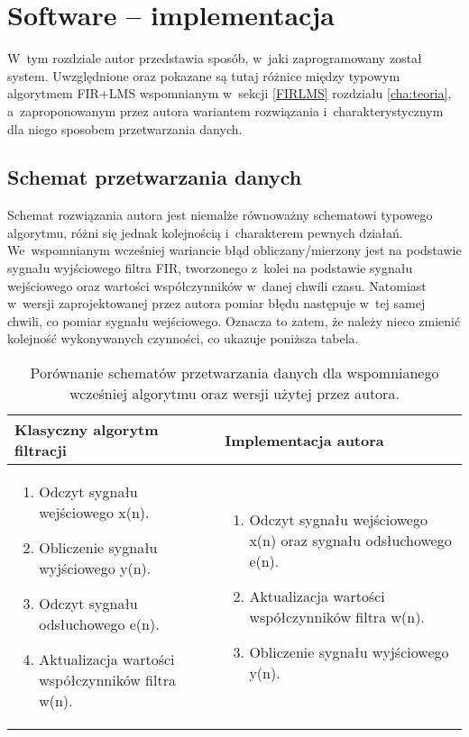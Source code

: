 \chapter{Software -- implementacja}
\label{cha:software}
W~tym rozdziale autor przedstawia sposób, w~jaki zaprogramowany został system. Uwzględnione oraz pokazane są tutaj różnice między typowym algorytmem FIR+LMS wspomnianym w~sekcji \ref{FIRLMS} rozdziału \ref{cha:teoria}, a~zaproponowanym przez autora wariantem rozwiązania i~charakterystycznym dla niego sposobem przetwarzania danych.
 
\section{Schemat przetwarzania danych}
Schemat rozwiązania autora jest niemalże równoważny schematowi typowego algorytmu, różni się jednak kolejnością i~charakterem pewnych działań. We~wspomnianym wcześniej wariancie błąd obliczany/mierzony jest na podstawie sygnału wyjściowego filtra FIR, tworzonego z~kolei na podstawie sygnału wejściowego oraz wartości współczynników w~danej chwili czasu. Natomiast w~wersji zaprojektowanej przez autora pomiar błędu następuje w~tej samej chwili, co pomiar sygnału wejściowego. Oznacza to zatem, że należy nieco zmienić kolejność wykonywanych czynności, co ukazuje poniższa tabela.
\begin{table}[h]
	\centering
	\caption{Porównanie schematów przetwarzania danych dla wspomnianego wcześniej algorytmu oraz wersji użytej przez autora.}
	\begin{tabular}{|p{}|p{}|}
		\toprule Klasyczny algorytm filtracji & Implementacja autora \\ \midrule
		\begin{enumerate}	
			\item Odczyt sygnału wejściowego x(n).
			\item Obliczenie sygnału wyjściowego y(n).
			\item Odczyt sygnału odsłuchowego e(n).
			\item Aktualizacja wartości współczynników filtra w(n).
		\end{enumerate} & 
		\begin{enumerate}	
			\item Odczyt sygnału wejściowego x(n) oraz sygnału odsłuchowego e(n).
			\item Aktualizacja wartości współczynników filtra w(n).
			\item Obliczenie sygnału wyjściowego y(n).
		\end{enumerate}\\ \bottomrule
	\end{tabular}
\end{table}

